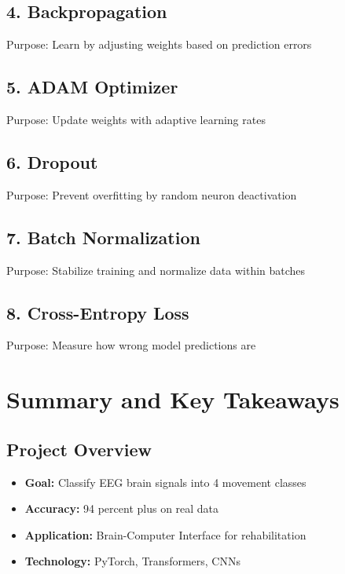 \documentclass[12pt,a4paper]{article}
\begin{document}
\subsection{4. Backpropagation}
Purpose: Learn by adjusting weights based on prediction errors

\subsection{5. ADAM Optimizer}
Purpose: Update weights with adaptive learning rates

\subsection{6. Dropout}
Purpose: Prevent overfitting by random neuron deactivation

\subsection{7. Batch Normalization}
Purpose: Stabilize training and normalize data within batches

\subsection{8. Cross-Entropy Loss}
Purpose: Measure how wrong model predictions are

\section{Summary and Key Takeaways}

\subsection{Project Overview}
\begin{itemize}
    \item \textbf{Goal:} Classify EEG brain signals into 4 movement classes
    \item \textbf{Accuracy:} 94 percent plus on real data
    \item \textbf{Application:} Brain-Computer Interface for rehabilitation
    \item \textbf{Technology:} PyTorch, Transformers, CNNs
\end{itemize}
\end{document}

